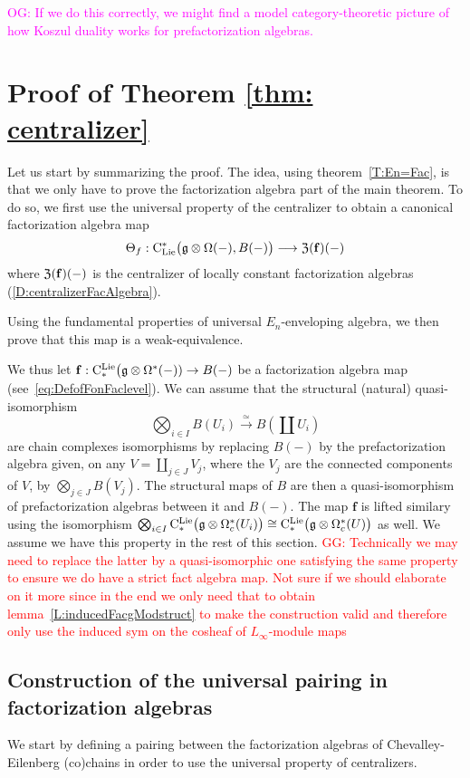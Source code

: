 \documentclass[11pt]{amsart}
\numberwithin{equation}{section}
\def\owen{\textcolor{magenta}{OG: }\textcolor{magenta}}
\def\greg{\textcolor{red}{GG: }\textcolor{red}}
\begin{document}
\owen{If we do this correctly, we might find a model category-theoretic picture of how Koszul duality works for prefactorization algebras.}

\section{Proof of Theorem \ref{thm: centralizer}}

Let us start by summarizing the proof. The idea, using theorem~\ref{T:En=Fac}, 
is that we only have to prove the factorization algebra part of the main theorem. 
To do so, we first use the universal property of the centralizer to obtain 
a canonical factorization algebra map 
\[\Theta_f: {\rm C}_{\rm Lie}^*\big(\mathfrak g\otimes \Omega (-), B(-) \big) \longrightarrow  {\frak Z}(\mathbf{f})(-)\]
where ${\frak Z}(\mathbf{f})(-)$ is the centralizer of locally constant factorization algebras (\ref{D:centralizerFacAlgebra}).


Using the fundamental properties of universal $E_n$-enveloping algebra, we then prove that 
this map is a weak-equivalence. 

\smallskip 

We thus let $\mathbf{f}: {\rm C}^{\rm Lie}_*\big(\mathfrak g \otimes \Omega^* (-)) \to B(-)$ be a factorization algebra map (see~\eqref{eq:DefofFonFaclevel}). We can 
assume that the structural (natural) quasi-isomorphism
$$\bigotimes_{i\in I} B(U_i) 
\stackrel{\simeq}\longrightarrow B(\coprod  U_i)$$ are chain complexes isomorphisms by replacing $B(-)$ by the prefactorization algebra 
given, on any $V=\coprod_{j\in J} V_j$, where the $V_j$ are the connected components of $V$, by   $\mathop{\bigotimes}\limits_{j\in J} B(V_j)$. 
The structural maps of $B$ are then a quasi-isomorphism of prefactorization algebras between it and $B(-)$. The map $\mathbf{f}$ is lifted similary using 
the isomorphism $\bigotimes_{i\in I} {\rm C}^{\rm Lie}_*\big(\mathfrak g \otimes \Omega_c^* (U_i)\big) \cong
{\rm C}^{\rm Lie}_*\big(\mathfrak g \otimes \Omega_c^* (U)\big)$ as well. We assume we have this property in the rest of this section.
\greg{Technically we may need to replace the latter by a quasi-isomorphic one satisfying the same property to ensure we do have a strict fact algebra map. 
Not sure if we should elaborate on it more since in the end we only need that to obtain lemma~\ref{L:inducedFacgModstruct} to make the construction valid 
and therefore only use the induced sym on the cosheaf of $L_\infty$-module maps}
\subsection{Construction of the universal pairing in factorization algebras}\label{SS:constuctionthetaf}
We start by defining a pairing between the factorization algebras of Chevalley-Eilenberg (co)chains in order to use the universal property of centralizers.
\end{document}
